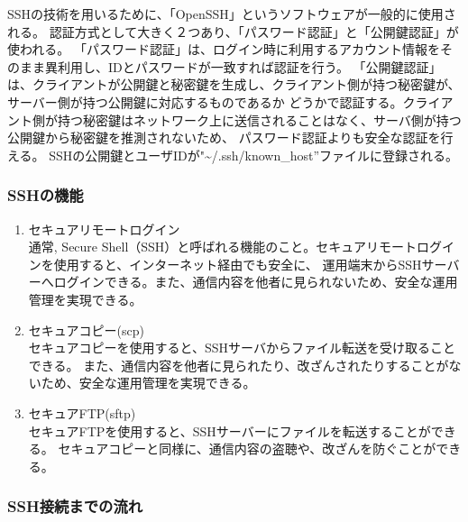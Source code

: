 \documentclass[12pt,a4paper,titlepage]{jsarticle}
\begin{document}
SSHの技術を用いるために、「OpenSSH」というソフトウェアが一般的に使用される。
認証方式として大きく２つあり、「パスワード認証」と「公開鍵認証」が使われる。
「パスワード認証」は、ログイン時に利用するアカウント情報をそのまま異利用し、IDとパスワードが一致すれば認証を行う。
「公開鍵認証」は、クライアントが公開鍵と秘密鍵を生成し、クライアント側が持つ秘密鍵が、サーバー側が持つ公開鍵に対応するものであるか
どうかで認証する。クライアント側が持つ秘密鍵はネットワーク上に送信されることはなく、サーバ側が持つ公開鍵から秘密鍵を推測されないため、
パスワード認証よりも安全な認証を行える。
SSHの公開鍵とユーザIDが"\textasciitilde/.ssh/known\_host''ファイルに登録される。
\subsubsection{SSHの機能}



\begin{enumerate}
    \item セキュアリモートログイン\mbox{}\\通常,
    Secure Shell（SSH）と呼ばれる機能のこと。セキュアリモートログインを使用すると、インターネット経由でも安全に、
    運用端末からSSHサーバーへログインできる。また、通信内容を他者に見られないため、安全な運用管理を実現できる。
    \item セキュアコピー(scp)\mbox{}\\セキュアコピーを使用すると、SSHサーバからファイル転送を受け取ることできる。
    また、通信内容を他者に見られたり、改ざんされたりすることがないため、安全な運用管理を実現できる。
    \item セキュアFTP(sftp)\mbox{}\\セキュアFTPを使用すると、SSHサーバーにファイルを転送することができる。
    セキュアコピーと同様に、通信内容の盗聴や、改ざんを防ぐことができる。
\end{enumerate}



\subsubsection{SSH接続までの流れ}
\end{document}
